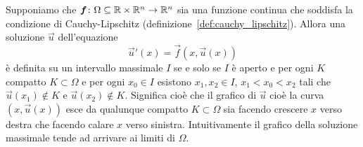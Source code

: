 \begin{proposition}
\label{prop:edo_massimale}
Supponiamo che $\boldsymbol f\colon \Omega\subseteq {\mathbb R}\times{\mathbb R}^n\to{\mathbb R}^n$
sia una funzione continua che soddisfa la condizione
di Cauchy-Lipschitz (definizione~\ref{def:cauchy_lipschitz}).
Allora una soluzione $\vec u$ dell'equazione
\begin{equation}\label{eq:edo_normale_ordine_uno}
  \vec u'(x) = \vec f(x, \vec u(x))
\end{equation}
è definita su un intervallo massimale $I$ se e solo se
$I$ è aperto e per ogni $K$ compatto $K\subset \Omega$
e per ogni $x_0 \in I$ esistono $x_1,x_2\in I$, $x_1 < x_0 < x_2$ tali che $\vec u(x_1)\not \in K$ e $\vec u(x_2) \not \in K$.
Significa cioè che il grafico di $\vec u$ cioè la curva $(x,\vec u(x))$ esce da qualunque compatto  
$K\subset \Omega$ sia facendo crescere $x$ verso destra che facendo calare $x$ verso sinistra.
Intuitivamente il grafico della soluzione massimale tende ad arrivare ai limiti di $\Omega$.
\end{proposition}
%
